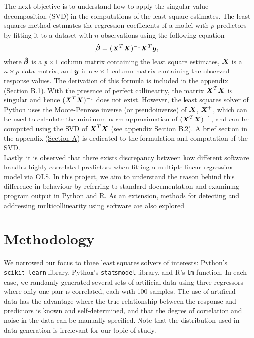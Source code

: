 \documentclass[12pt]{article}
\newcommand{\gbh}{\hat{\gb}}
\begin{document}
	The next objective is to understand how to apply the singular value decomposition (SVD) in the computations of the least square estimates. The least squares method estimates the regression coefficients of a model with $p$ predictors by fitting it to a dataset with $n$ observations using the following equation
	\begin{equation} \label{eq1}
		\boldsymbol{\gbh}=(\bmX^T\bmX)^{-1}\bmX^T\bmy,
	\end{equation}
	where $\boldsymbol{\gbh}$ is a $p\times 1$ column matrix containing the least square estimates, $\boldsymbol{X}$ is a $n\times p$ data matrix, and $\boldsymbol{y}$ is a $n\times 1$ column matrix containing the observed response values. The derivation of this formula is included in the appendix (\hyperref[sec:append1]{Section B.1}). With the presence of perfect collinearity, the matrix $\boldsymbol{X}^T\boldsymbol{X}$ is singular and hence $(\boldsymbol{X}^T\boldsymbol{X})^{-1}$ does not exist. However, the least squares solver of Python uses the Moore-Penrose inverse (or pseudoinverse) of $\boldsymbol{X}$, $\boldsymbol{X}^+$, which can be used to calculate the minimum norm approximation of $(\boldsymbol{X}^T\boldsymbol{X})^{-1}$, and can be computed using the SVD of $\boldsymbol{X}^T\boldsymbol{X}$ (see appendix \hyperref[sec:append2]{Section B.2}). A brief section in the appendix (\hyperref[sec:svd]{Section A}) is dedicated to the formulation and computation of the SVD.\\
	
	Lastly, it is observed that there exists discrepancy between how different software handles highly correlated predictors when fitting a multiple linear regression model via OLS. In this project, we aim to understand the reason behind this difference in behaviour by referring to standard documentation and examining program output in Python and R. As an extension, methods for detecting and addressing multicollinearity using software are also explored.
	
	\section{Methodology}
	
	We narrowed our focus to three least squares solvers of interests: Python's \texttt{scikit-learn} library, Python's \texttt{statsmodel} library, and R's \texttt{lm} function. In each case, we randomly generated several sets of artificial data using three regressors where only one pair is correlated, each with 100 samples. The use of artificial data has the advantage where the true relationship between the response and predictors is known and self-determined, and that the degree of correlation and noise in the data can be manually specified. Note that the distribution used in data generation is irrelevant for our topic of study.\\
	
\end{document}
